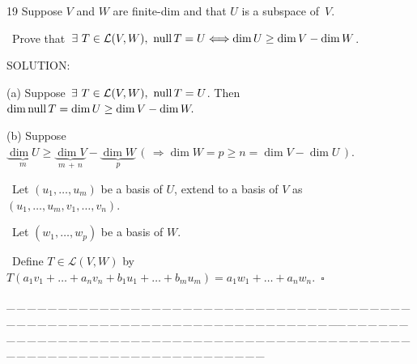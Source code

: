 \documentclass[a4paper, 11pt, UTF8]{article}
\def\null{\textup{null\,}}
\def\Lm{\mathcal{L}}
\begin{document}
\begin{large}
{\timesbf\Large 19} {\timessl\Large 
Suppose $V$ and $W$ are finite-dim and that $U$ is a subspace of \,$V$.}\par\quad\,
{\timessl\Large Prove that $\,\exists\,\,T\in\Lm(V, W),\,\,\null T = U\Longleftrightarrow\dim U\geq\dim V-\dim W$.
}\par
{\timesbf S\footnotesize{OLUTION:}}\par\quad
(a) Suppose $\,\exists\,\,T\in\Lm(V, W),\,\,\null T = U$. Then $\dim\null T=\dim U\geq\dim V-\dim W.$\par\quad
(b) Suppose $\underbrace{\dim U}_{m}\geq\underbrace{\dim V}_{m\,+\,n}-\underbrace{\dim W}_{p}\,(\,\Rightarrow\dim W=p\geq n=\dim V-\dim U\,)$.\par\qquad\,
Let $(u_1,\dots,u_m)$ be a basis of $U$, extend to a basis of $V$ as $(u_1,\dots,u_m,v_1,\dots,v_n).$\par\qquad\,
Let $(w_1,\dots,w_p)$ be a basis of $W$.\par\qquad\,
Define $T\in\Lm(V,W)$ by $T(a_1 v_1+\dots+a_n v_n+b_1 u_1+\dots+b_m u_m)=a_1 w_1+\dots+a_n w_n.\,\,\,\square$\par
{\tiny \_\,\_\,\_\,\_\,\_\,\_\,\_\,\_\,\_\,\_\,\_\,\_\,\_\,\_\,\_\,\_\,\_\,\_\,\_\,\_\,\_\,\_\,\_\,\_\,\_\,\_\,\_\,\_\,\_\,\_\,\_\,\_\,\_\,\_\,\_\,\_\,\_\,\_\,\_\,\_\,\_\,\_\,\_\,\_\,\_\,\_\,\_\,\_\,\_\,\_\,\_\,\_\,\_\,\_\,\_\,\_\,\_\,\_\,\_\,\_\,\_\,\_\,\_\,\_\,\_\,\_\,\_\,\_\,\_\,\_\,\_\_\,\_\,\_\,\_\,\_\,\_\,\_\,\_\,\_\,\_\,\_\,\_\,\_\,\_\,\_\,\_\,\_\,\_\,\_\,\_\,\_\,\_\,\_\,\_\,\_\,\_\,\_\,\_\,\_\,\_\,\_\,\_\,\_\,\_\,\_\,\_\,\_\,\_\,\_\,\_\,\_\,\_\,\_\,\_\,\_\,\_\,\_\,\_\,\_\,\_\,\_\,\_\,\_\,\_\,\_\,\_\,\_\,\_\,\_\,\_\,\_\,\_\,\_\,\_\,\_\,\_\,\_\,\_\,\_\,\_\,\_}\par


\end{large}
\end{document}
